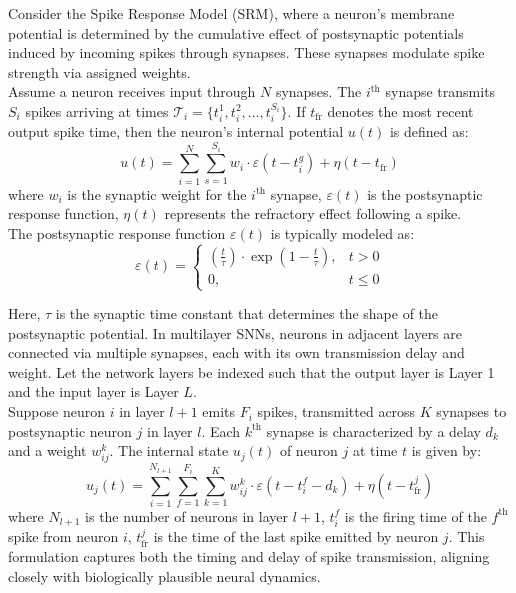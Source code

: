 \noindent Consider the Spike Response Model (SRM), where a neuron's membrane potential is determined by the cumulative effect of postsynaptic potentials induced by incoming spikes through synapses. These synapses modulate spike strength via assigned weights.\\

\noindent Assume a neuron receives input through $N$ synapses. The $i^{\text{th}}$ synapse transmits $S_i$ spikes arriving at times $\mathcal{T}_i = \{t^1_i, t^2_i, \dots, t^{S_i}_i\}$. If $t_{\text{fr}}$ denotes the most recent output spike time, then the neuron's internal potential $u(t)$ is defined as:
\begin{equation}
    u(t) = \sum_{i=1}^{N} \sum_{s=1}^{S_i} w_i \cdot \varepsilon(t - t^g_i) + \eta(t - t_{\text{fr}})
    \label{eq:6.38}
\end{equation}
where $w_i$ is the synaptic weight for the $i^{\text{th}}$ synapse, $\varepsilon(t)$ is the postsynaptic response function, $\eta(t)$ represents the refractory effect following a spike.\\

\noindent The postsynaptic response function $\varepsilon(t)$ is typically modeled as:
\begin{equation}
    \varepsilon(t) =
    \begin{cases}
    \left(\frac{t}{\tau}\right) \cdot \exp\left(1 - \frac{t}{\tau}\right), & t > 0 \\
    0, & t \leq 0
    \end{cases}
    \label{eq:6.39}
\end{equation}

\noindent Here, $\tau$ is the synaptic time constant that determines the shape of the postsynaptic potential. In multilayer SNNs, neurons in adjacent layers are connected via multiple synapses, each with its own transmission delay and weight. Let the network layers be indexed such that the output layer is Layer 1 and the input layer is Layer $L$. \\

\noindent Suppose neuron $i$ in layer $l+1$ emits $F_i$ spikes, transmitted across $K$ synapses to postsynaptic neuron $j$ in layer $l$. Each $k^{\text{th}}$ synapse is characterized by a delay $d_k$ and a weight $w^k_{ij}$. The internal state $u_j(t)$ of neuron $j$ at time $t$ is given by:
\begin{equation}
    u_j(t) = \sum_{i=1}^{N_{l+1}} \sum_{f=1}^{F_i} \sum_{k=1}^{K} w^k_{ij} \cdot \varepsilon(t - t^f_i - d_k) + \eta(t - t^j_{\text{fr}})
    \label{eq:6.40}
\end{equation}
where $N_{l+1}$ is the number of neurons in layer $l+1$, $t^f_i$ is the firing time of the $f^{\text{th}}$ spike from neuron $i$, $t^j_{\text{fr}}$ is the time of the last spike emitted by neuron $j$. This formulation captures both the timing and delay of spike transmission, aligning closely with biologically plausible neural dynamics.\\

